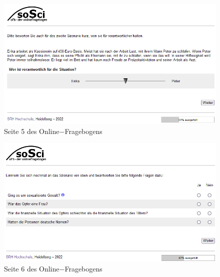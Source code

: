 \begin{appendices}
    \newpage
    \begin{figure}[htb!]
        \centering
            \includegraphics[width=\textwidth, frame]{Seite 5.png}
            \caption[]{Seite 5 des Online$-$Fragebogens}
    \end{figure}
    
    \begin{figure}[htb!]
        \centering
            \includegraphics[width=\textwidth, frame]{Seite 6.png}
            \caption[]{Seite 6 des Online$-$Fragebogens}
    \end{figure}
    

\end{appendices}
